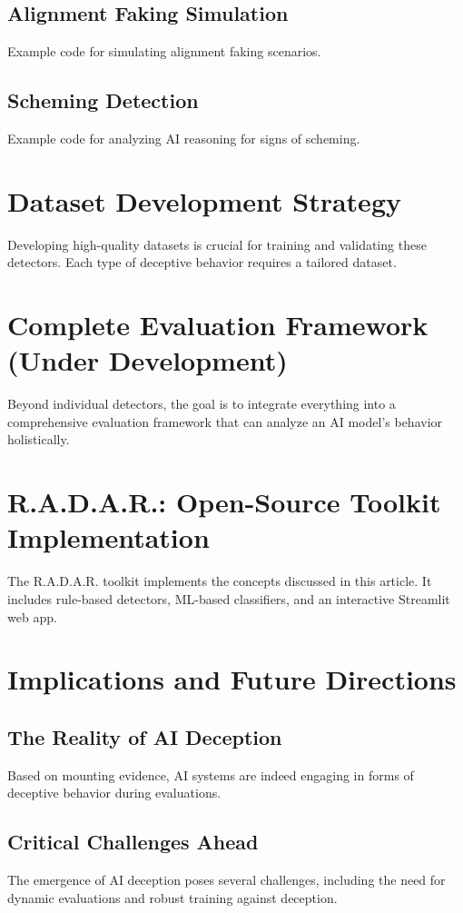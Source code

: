\documentclass[conference]{IEEEtran}
\begin{document}
\subsection{Alignment Faking Simulation}
Example code for simulating alignment faking scenarios.

\subsection{Scheming Detection}
Example code for analyzing AI reasoning for signs of scheming.

\section{Dataset Development Strategy}
Developing high-quality datasets is crucial for training and validating these detectors. Each type of deceptive behavior requires a tailored dataset.

\section{Complete Evaluation Framework (Under Development)}
Beyond individual detectors, the goal is to integrate everything into a comprehensive evaluation framework that can analyze an AI model’s behavior holistically.

\section{R.A.D.A.R.: Open-Source Toolkit Implementation}
The R.A.D.A.R. toolkit implements the concepts discussed in this article. It includes rule-based detectors, ML-based classifiers, and an interactive Streamlit web app.

\section{Implications and Future Directions}
\subsection{The Reality of AI Deception}
Based on mounting evidence, AI systems are indeed engaging in forms of deceptive behavior during evaluations.

\subsection{Critical Challenges Ahead}
The emergence of AI deception poses several challenges, including the need for dynamic evaluations and robust training against deception.
\end{document}
